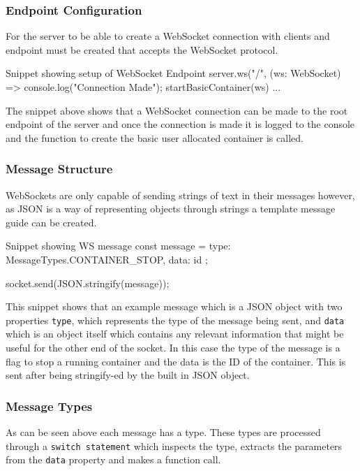 \subsubsection{Endpoint Configuration}

For the server to be able to create a WebSocket connection with clients and endpoint must be created that accepts the WebSocket protocol. 

\begin{sexylisting}{Snippet showing setup of WebSocket Endpoint}
    server.ws("/", (ws: WebSocket) => {
        console.log("Connection Made");
        startBasicContainer(ws)
        {...}
    }
\end{sexylisting}

The snippet above shows that a WebSocket connection can be made to the root endpoint of the server and once the connection is made it is logged to the console and the function to create the basic user allocated container is called.

\subsubsection{Message Structure}

WebSockets are only capable of sending strings of text in their messages however, as JSON is a way of representing objects through strings a template message guide can be created.

\begin{sexylisting}{Snippet showing WS message}
    const message = {
        type: MessageTypes.CONTAINER_STOP,
        data: { id }
    };

    socket.send(JSON.stringify(message));
\end{sexylisting}

This snippet shows that an example message which is a JSON object with two properties \texttt{type}, which represents the type of the message being sent, and \texttt{data} which is an object itself which contains any relevant information that might be useful for the other end of the socket. In this case the type of the message is a flag to stop a running container and the data is the ID of the container. This is sent after being stringify-ed by the built in JSON object.

\subsubsection{Message Types}

As can be seen above each message has a type. These types are processed through a \texttt{switch statement} which inspects the type, extracts the parameters from the \texttt{data} property and makes a function call.

